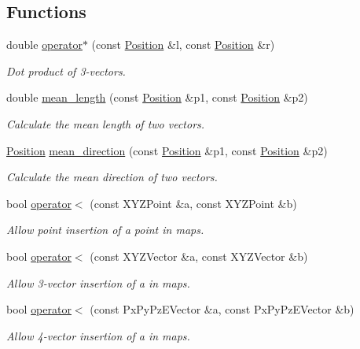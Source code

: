 \subsection*{Functions}
\begin{DoxyCompactItemize}
\item 
double \hyperlink{namespace_r_o_o_t_1_1_math_ad7a11e4384dc9dcc6a3e4e892391f26b}{operator$\ast$} (const \hyperlink{namespace_r_o_o_t_1_1_math_ac2622efe8212cb8b8a8893efd5117de8}{Position} \&l, const \hyperlink{namespace_r_o_o_t_1_1_math_ac2622efe8212cb8b8a8893efd5117de8}{Position} \&r)
\begin{DoxyCompactList}\small\item\em Dot product of 3-\/vectors. \end{DoxyCompactList}\item 
double \hyperlink{namespace_r_o_o_t_1_1_math_ae1d6c364099dacd36db12d2ece5adb9c}{mean\+\_\+length} (const \hyperlink{namespace_r_o_o_t_1_1_math_ac2622efe8212cb8b8a8893efd5117de8}{Position} \&p1, const \hyperlink{namespace_r_o_o_t_1_1_math_ac2622efe8212cb8b8a8893efd5117de8}{Position} \&p2)
\begin{DoxyCompactList}\small\item\em Calculate the mean length of two vectors. \end{DoxyCompactList}\item 
\hyperlink{namespace_r_o_o_t_1_1_math_ac2622efe8212cb8b8a8893efd5117de8}{Position} \hyperlink{namespace_r_o_o_t_1_1_math_a06af24d8ff174f2f4d14850e63adc68f}{mean\+\_\+direction} (const \hyperlink{namespace_r_o_o_t_1_1_math_ac2622efe8212cb8b8a8893efd5117de8}{Position} \&p1, const \hyperlink{namespace_r_o_o_t_1_1_math_ac2622efe8212cb8b8a8893efd5117de8}{Position} \&p2)
\begin{DoxyCompactList}\small\item\em Calculate the mean direction of two vectors. \end{DoxyCompactList}\item 
bool \hyperlink{namespace_r_o_o_t_1_1_math_ae526386c3fc57d159a6b9f227c859521}{operator$<$} (const X\+Y\+Z\+Point \&a, const X\+Y\+Z\+Point \&b)
\begin{DoxyCompactList}\small\item\em Allow point insertion of a point in maps. \end{DoxyCompactList}\item 
bool \hyperlink{namespace_r_o_o_t_1_1_math_a3bf72adbd1dc8071ef0283f0e253974a}{operator$<$} (const X\+Y\+Z\+Vector \&a, const X\+Y\+Z\+Vector \&b)
\begin{DoxyCompactList}\small\item\em Allow 3-\/vector insertion of a in maps. \end{DoxyCompactList}\item 
bool \hyperlink{namespace_r_o_o_t_1_1_math_a1c3af6f88f23ab799472c3e6621364ea}{operator$<$} (const Px\+Py\+Pz\+E\+Vector \&a, const Px\+Py\+Pz\+E\+Vector \&b)
\begin{DoxyCompactList}\small\item\em Allow 4-\/vector insertion of a in maps. \end{DoxyCompactList}\end{DoxyCompactItemize}


